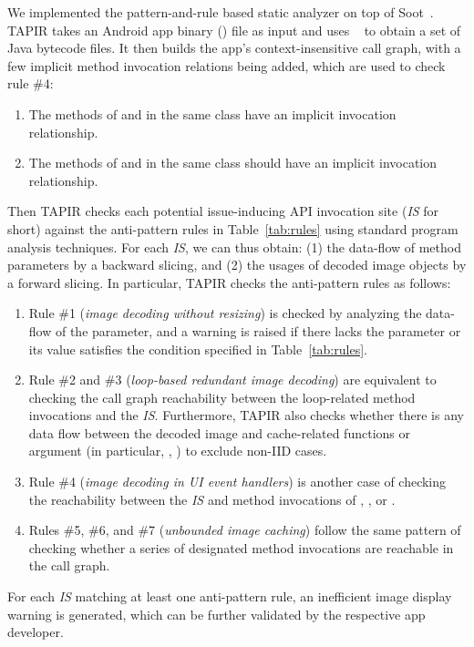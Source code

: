 We implemented the pattern-and-rule based static analyzer on top of Soot~\cite{soot}.
TAPIR takes an Android app binary () file as input and uses ~\cite{dex2jar} to obtain a set of Java bytecode files.
It then builds the app's context-insensitive call graph,
with a few implicit method invocation relations being added, which are used to check rule \#4:

\begin{enumerate}
  \item The methods of  and  in the same class have an implicit invocation relationship.
  \item The methods of  and  in the same class should have an implicit invocation relationship.
\end{enumerate}


Then TAPIR checks each potential issue-inducing API invocation site (\emph{IS} for short) against the anti-pattern rules in Table~\ref{tab:rules} using standard program analysis techniques.
For each \emph{IS}, we can thus obtain:
(1) the data-flow of method parameters by a backward slicing, and
(2) the usages of decoded image objects by a forward slicing. In particular, TAPIR checks the anti-pattern rules as follows:

\begin{enumerate}
  \item Rule \#1 (\emph{image decoding without resizing}) is checked by analyzing the data-flow of the  parameter,
  and a warning is raised if there lacks the  parameter or its value satisfies the condition specified in Table~\ref{tab:rules}.
  \item Rule \#2 and \#3 (\emph{loop-based redundant image decoding}) are equivalent to checking the call graph reachability between the loop-related method invocations and the \emph{IS}. Furthermore, TAPIR also checks whether there is any data flow between the decoded image and cache-related functions or argument (in particular, ,  ) to exclude non-IID cases.
  \item Rule \#4 (\emph{image decoding in UI event handlers}) is another case of checking the reachability between the \emph{IS} and method invocations of , , or .
  \item Rules \#5, \#6, and \#7 (\emph{unbounded image caching}) follow the same pattern of checking whether a series of designated method invocations are reachable in the call graph.
\end{enumerate}

For each \emph{IS} matching at least one anti-pattern rule,
an inefficient image display warning is generated,
which can be further validated by the respective app developer.